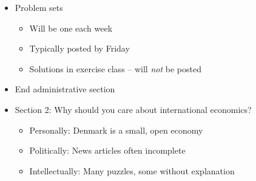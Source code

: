 \documentclass[ignorenonframetext,]{beamer}
\begin{document}
\begin{frame}

\begin{itemize}
\itemsep1pt\parskip0pt
\item
    Problem sets

  \begin{itemize}
  \itemsep1pt\parskip0pt
  \item
      Will be one each week
  \item
      Typically posted by Friday
  \item
      Solutions in exercise class -- will \emph{not} be posted
  \end{itemize}
\end{itemize}

\end{frame}

\begin{frame}

\begin{itemize}
\itemsep1pt\parskip0pt
\item
    End administrative section
\end{itemize}

\end{frame}


\begin{frame}

    \begin{itemize}
    \itemsep1pt\parskip0pt
        \item
        Section 2: Why should you care about international economics?
        \begin{itemize}
        \itemsep1pt\parskip0pt
            \item Personally: Denmark is a small, open economy
            \item Politically: News articles often incomplete
            \item Intellectually: Many puzzles, some without explanation
        \end{itemize}
    \end{itemize}

\end{frame}
\end{document}
